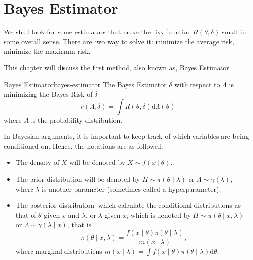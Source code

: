 \chapter{Bayes Estimator}

We shall look for some estimators that make the risk function $R\left(\theta,\delta\right)$ small in some overall sense. There are two way to solve it: minimize the average risk, minimize the maximum risk.

This chapter will discuss the first method, also known as, Bayes Estimator.

\begin{definition}{Bayes Estimator}{bayes-estimator}
    The Bayes Estimator $\delta$ with respect to $\Lambda$ is minimizing the Bayes Risk of $\delta$
    \begin{equation}
        r\left(\Lambda, \delta\right)=\int R\left(\theta, \delta\right) \mathrm{d} \Lambda\left(\theta\right)
    \end{equation}
    where $\Lambda$ is the probability distribution.
\end{definition}

In Bayesian arguments, it is important to keep track of which variables are being conditioned on. Hence, the notations are as followed:
\begin{itemize}
    \item The density of $X$ will be denoted by $X \sim f\left(x \mid \theta\right)$.
    \item The prior distribution will be denoted by $\Pi \sim \pi\left(\theta \mid \lambda\right)$ or $\Lambda \sim \gamma\left(\lambda\right)$, where $\lambda$ is another parameter (sometimes called a hyperparameter).
    \item The posterior distribution, which calculate the conditional distributions as that of $\theta$ given $x$ and $\lambda$, or $\lambda$ given $x$, which is denoted by $\Pi \sim \pi\left(\theta \mid x, \lambda\right)$ or $\Lambda \sim \gamma\left(\lambda \mid x\right)$, that is
          \begin{equation}
              \pi\left(\theta \mid x, \lambda\right) = \frac{f\left(x \mid \theta\right) \pi\left(\theta \mid \lambda\right)}{m\left(x \mid \lambda\right)},
          \end{equation}
          where marginal distributions $m\left(x \mid \lambda\right) = \int f\left(x \mid \theta\right) \pi\left(\theta \mid \lambda\right) \mathrm{d} \theta$.
\end{itemize}

